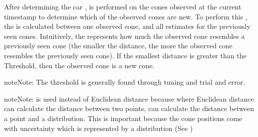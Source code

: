 \documentclass[letterpaper,10pt,english]{sphinxmanual}
\begin{document}
\sphinxAtStartPar
After determining the car {\hyperref[\detokenize{glossary:term-Pose}]{}}, {\hyperref[\detokenize{glossary:term-Data-Association}]{}} is performed on the cones observed at the current timestamp to determine which of the observed cones are new. To perform this {\hyperref[\detokenize{glossary:term-Data-Association}]{}}, the {\hyperref[\detokenize{glossary:term-Mahalanobis-Distance}]{}} is calculated between one observed cone, and all {\hyperref[\detokenize{glossary:term-iSAM2}]{}} estimates for the previously seen cones. Intuitively, the {\hyperref[\detokenize{glossary:term-Mahalanobis-Distance}]{}} represents how much the observed cone resembles a previously seen cone (the smaller the distance, the more the observed cone resembles the previously seen cone). If the smallest distance is greater than the {\hyperref[\detokenize{glossary:term-Mahalanobis-Distance}]{}} Threshold, then the observed cone is a new cone.

\begin{sphinxadmonition}{note}{Note:}
\sphinxAtStartPar
The {\hyperref[\detokenize{glossary:term-Mahalanobis-Distance}]{}} threshold is generally found through tuning and trial and error.
\end{sphinxadmonition}

\begin{sphinxadmonition}{note}{Note:}
\sphinxAtStartPar
{\hyperref[\detokenize{glossary:term-Mahalanobis-Distance}]{}} is used instead of Euclidean distance because where Euclidean distance can calculate the distance between two points, {\hyperref[\detokenize{glossary:term-Mahalanobis-Distance}]{}} can calculate the distance between a point and a distribution. This is important because the cone positions come with uncertainty which is represented by a distribution (See )
\end{sphinxadmonition}
\end{document}
